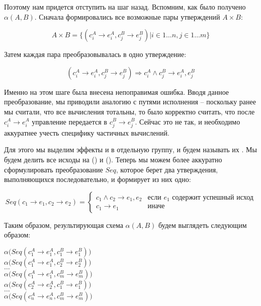 Поэтому нам придется отступить на шаг назад. Вспомним, как было получено $\alpha(A, B)$. Сначала формировались все возможные пары утверждений $A \times B$:

$$A \times B = \big\{ (c^A_i \rightarrow e^A_i, c^B_j \rightarrow e^B_j) \rvert i \in 1 \ldots n, j \in 1 \ldots m \big\}$$

Затем каждая пара преобразовывалась в одно утверждение:

$$ (c^A_i \rightarrow e^A_i, c^B_j \rightarrow e^B_j) \Rightarrow c^A_i \land c^B_j \rightarrow e^A_i, e^B_j $$

Именно на этом шаге была внесена непоправимая ошибка. Вводя данное преобразование, мы приводили аналогию с путями исполнения -- поскольку ранее мы считали, что все вычисления тотальны, то было корректно считать, что после $c^A_i \rightarrow e^A_i$ управление передается в $c^B_j \rightarrow e^B_j$. Сейчас это не так, и необходимо аккуратнее учесть специфику частичных вычислений.

Для этого мы выделим эффекты  и  в отдельную группу, и будем называть их . Мы будем делить все исходы на  () и  (). Теперь мы можем более аккуратно сформулировать преобразование $Seq$, которое берет два утверждения, выполняющихся последовательно, и формирует из них одно:

\[
Seq(c_1 \rightarrow e_1, c_2 \rightarrow e_2) = 
\begin{cases}
c_1 \land c_2 \rightarrow e_1, e_2 & \text{если } e_1 \text{ содержит успешный исход} \\
c_1 \rightarrow e_1 			   & \text{иначе}
\end{cases}
\]

Таким образом, результирующая схема $\alpha(A, B)$ будем выглядеть следующим образом:

{
	 $\alpha\Big(Seq (c^A_1 \rightarrow e^A_1, c^B_1 \rightarrow e^B_1) \Big)$ \\
	 $\alpha\Big(Seq (c^A_1 \rightarrow e^A_1, c^B_2 \rightarrow e^B_2) \Big)$ \\
	 $\ldots$ \\
	 $\alpha\Big(Seq (c^A_1 \rightarrow e^A_1, c^B_m \rightarrow e^B_m) \Big)$ \\
	 $\alpha\Big(Seq (c^A_2 \rightarrow e^A_2, c^B_1 \rightarrow e^B_1) \Big)$ \\
	 $\ldots$ \\
	 $\alpha\Big(Seq (c^A_n \rightarrow e^A_n, c^B_m \rightarrow e^B_m) \Big)$ \\
}
{}


